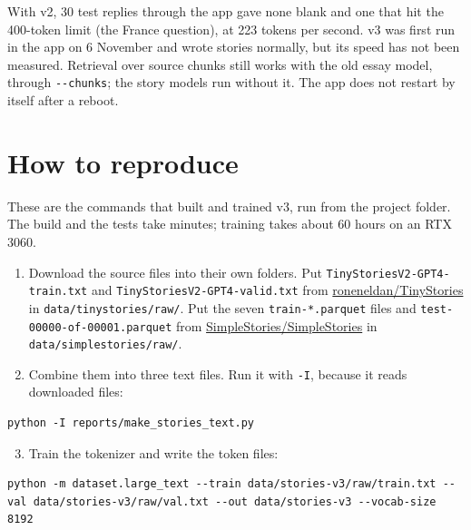 \documentclass[11pt,a4paper]{article}
\newcommand{\code}[1]{\texttt{#1}}
\begin{document}
With v2, 30 test replies through the app gave none blank and one that hit the 400-token limit (the France question), at 223 tokens per second. v3 was first run in the app on 6 November and wrote stories normally, but its speed has not been measured. Retrieval over source chunks still works with the old essay model, through \code{-\allowbreak{}-\allowbreak{}chunks}; the story models run without it. The app does not restart by itself after a reboot.

\section*{How to reproduce}
{}

These are the commands that built and trained v3, run from the project folder. The build and the tests take minutes; training takes about 60 hours on an RTX 3060.

\begin{enumerate}
\item Download the source files into their own folders. Put \code{TinyStoriesV2-\allowbreak{}GPT4-\allowbreak{}train.\allowbreak{}txt} and \code{TinyStoriesV2-\allowbreak{}GPT4-\allowbreak{}valid.\allowbreak{}txt} from \href{https://huggingface.co/datasets/roneneldan/TinyStories}{roneneldan/TinyStories} in \code{data/\allowbreak{}tinystories/\allowbreak{}raw/\allowbreak{}}. Put the seven \code{train-\allowbreak{}*.\allowbreak{}parquet} files and \code{test-\allowbreak{}00000-\allowbreak{}of-\allowbreak{}00001.\allowbreak{}parquet} from \href{https://huggingface.co/datasets/SimpleStories/SimpleStories}{SimpleStories/SimpleStories} in \code{data/\allowbreak{}simplestories/\allowbreak{}raw/\allowbreak{}}.
\item Combine them into three text files. Run it with \code{-\allowbreak{}I}, because it reads downloaded files:
\end{enumerate}

\begin{lstlisting}
python -I reports/make_stories_text.py
\end{lstlisting}

\begin{enumerate}
\setcounter{enumi}{2}
\item Train the tokenizer and write the token files:
\end{enumerate}

\begin{lstlisting}
python -m dataset.large_text --train data/stories-v3/raw/train.txt --val data/stories-v3/raw/val.txt --out data/stories-v3 --vocab-size 8192
\end{lstlisting}
\end{document}
